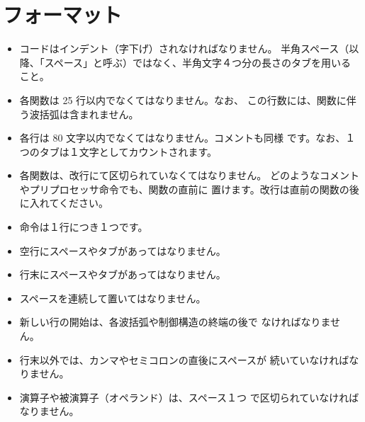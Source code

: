 \documentclass{42-ja}
\begin{document}
    \section{フォーマット}

            \begin{itemize}

                \item コードはインデント（字下げ）されなければなりません。
					半角スペース（以降、「スペース」と呼ぶ）ではなく、半角文字４つ分の長さのタブを用いること。

                \item 各関数は 25 行以内でなくてはなりません。なお、
					この行数には、関数に伴う波括弧は含まれません。

                \item 各行は 80 文字以内でなくてはなりません。コメントも同様
					です。なお、１つのタブは１文字としてカウントされます。

                \item 各関数は、改行にて区切られていなくてはなりません。
					どのようなコメントやプリプロセッサ命令でも、関数の直前に
					置けます。改行は直前の関数の後に入れてください。

                \item 命令は１行につき１つです。

				\item 空行にスペースやタブがあってはなりません。

				\item 行末にスペースやタブがあってはなりません。

                \item スペースを連続して置いてはなりません。

                \item 新しい行の開始は、各波括弧や制御構造の終端の後で
					なければなりません。

                \item 行末以外では、カンマやセミコロンの直後にスペースが
					続いていなければなりません。

                \item 演算子や被演算子（オペランド）は、スペース１つ
					で区切られていなければなりません。


\end{itemize}
\end{document}

